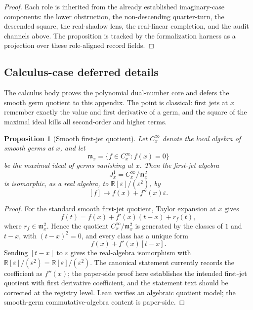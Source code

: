 \documentclass[11pt]{article}
\newcommand{\R}{\mathbb R}
\newcommand{\Dual}{\R[\varepsilon]/(\varepsilon^2)}
\newtheorem{proposition}[theorem]{Proposition}
\theoremstyle{definition}
\begin{document}
\begin{proof}
Each role is inherited from the already established imaginary-case components:
the lower obstruction, the non-descending quarter-turn, the descended square,
the real-shadow lens, the real-linear completion, and the audit channels above.
The proposition is tracked by the formalization harness as a projection over
these role-aligned record fields.
\end{proof}

\subsection{Calculus-case deferred details}
\label{appsubsec:methods-calculus}

The calculus body proves the polynomial dual-number core and defers the smooth
germ quotient to this appendix.  The point is classical: first jets at \(x\)
remember exactly the value and first derivative of a germ, and the square of the
maximal ideal kills all second-order and higher terms.

\begin{proposition}[Smooth first-jet quotient]
\label{prop:jet-smooth-first-jet-quotient}
Let \(C^\infty_x\) denote the local algebra of smooth germs at \(x\), and let
\[
\mathfrak m_x=\{f\in C^\infty_x:f(x)=0\}
\]
be the maximal ideal of germs vanishing at \(x\).  Then the first-jet algebra
\[
J_x^1=C^\infty_x/\mathfrak m_x^2
\]
is isomorphic, as a real algebra, to \(\Dual\), by
\[
[f]\longmapsto f(x)+f''(x)\varepsilon.
\]
\end{proposition}

\begin{proof}
For the standard smooth first-jet quotient, Taylor expansion at \(x\) gives
\[
f(t)=f(x)+f'(x)(t-x)+r_f(t),
\]
where \(r_f\in\mathfrak m_x^2\).  Hence the quotient
\(C^\infty_x/\mathfrak m_x^2\) is generated by the classes of \(1\) and
\(t-x\), with \((t-x)^2=0\), and every class has a unique form
\[
f(x)+f'(x)[t-x].
\]
Sending \([t-x]\) to \(\varepsilon\) gives the real-algebra isomorphism with
\(\Dual=\mathbb R[\varepsilon]/(\varepsilon^2)\).  The canonical statement
currently records the coefficient as \(f''(x)\); the paper-side proof here
establishes the intended first-jet quotient with first derivative coefficient,
and the statement text should be corrected at the registry level.  Lean verifies
an algebraic quotient model; the smooth-germ commutative-algebra content is
paper-side.
\end{proof}
\end{document}
